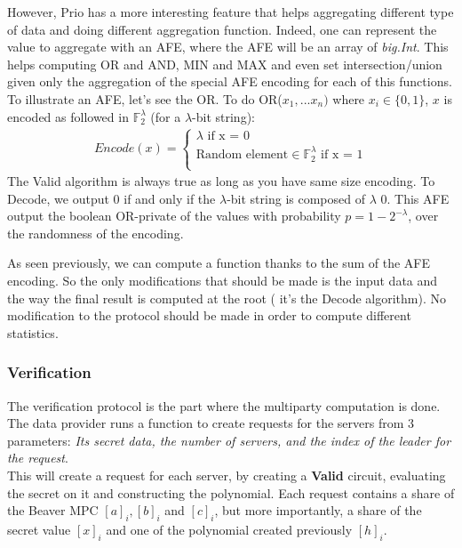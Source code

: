 \documentclass{article}
\begin{document}
However, Prio has a more interesting feature that helps aggregating different type of data and doing different aggregation function. Indeed, one can represent the value to aggregate with an AFE, where the AFE will be an array of \textit{big.Int}. This helps computing OR and AND, MIN and MAX and even set intersection/union given only the aggregation of the special AFE encoding for each of this functions.\\
To illustrate an AFE, let's see the OR. To do OR($x_1,...x_n)$ where $x_i \in \{0,1\} $, $x$ is encoded as followed in $\mathbb{F}_2^{\lambda}$ (for a $\lambda$-bit string):
\begin{align*}
    Encode(x)=\left\{
                \begin{array}{ll}
                  \lambda		\text{                                          if x = 0}\\
                  \text{Random element} \in \mathbb{F}^{\lambda}_{2}		\text{											if x = 1}\\
                \end{array}
              \right.
\end{align*}
The Valid algorithm is always true as long as you have same size encoding. To Decode, we output 0 if and only if the $\lambda$-bit string is composed of $\lambda$ 0. This AFE output the boolean OR-private of the values with probability $p = 1- 2^{-\lambda}$, over the randomness of the encoding.

As seen previously, we can compute a function thanks to the sum of the AFE encoding. So the only modifications that should be made is the input data and the way the final result is computed at the root ( it's the Decode algorithm). No modification to the protocol should be made in order to compute different statistics.

\subsubsection*{Verification}
The verification protocol is the part where the multiparty computation is done. The data provider runs a function to create requests for the servers from 3 parameters: \textit{Its secret data, the number of servers, and the index of the leader for the request}.\\
This will create a request for each server, by creating a \textbf{Valid} circuit, evaluating the secret on it and constructing the polynomial. Each request contains a share of the Beaver MPC $[a]_i, [b]_i $ and $ [c]_i$, but more importantly, a share of the secret value $[x]_i$ and one of the polynomial created previously $[h]_i$.\\
\end{document}
